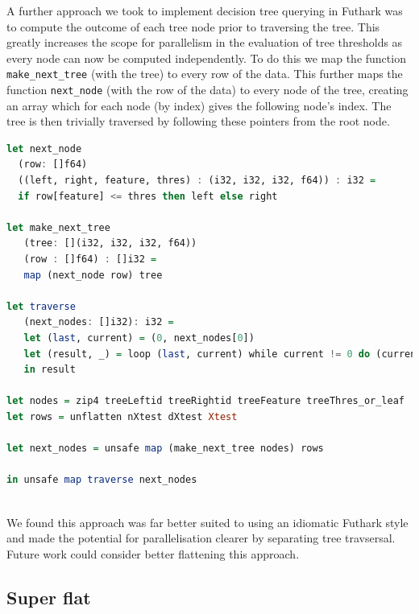 \documentclass[a4paper]{article}
\begin{document}
A further approach we took to implement decision tree querying in Futhark was to compute the outcome of each tree node prior to traversing the tree. This greatly increases the scope for parallelism in the evaluation of tree thresholds as every node can now be computed independently. To do this we map the function \texttt{make\_next\_tree} (with the tree) to every row of the data. This further maps the function \texttt{next\_node} (with the row of the data) to every node of the tree, creating an array which for each node (by index) gives the following node's index. The tree is then trivially traversed by following these pointers from the root node.

\vspace{1ex}
\begin{lrbox}{\lstboxfour}
\begin{minipage}{\textwidth}
\begin{lstlisting}[language=Haskell, breaklines]
let next_node
  (row: []f64)
  ((left, right, feature, thres) : (i32, i32, i32, f64)) : i32 =
  if row[feature] <= thres then left else right

let make_next_tree
   (tree: [](i32, i32, i32, f64))
   (row : []f64) : []i32 =
   map (next_node row) tree

let traverse
   (next_nodes: []i32): i32 =
   let (last, current) = (0, next_nodes[0])
   let (result, _) = loop (last, current) while current != 0 do (current, next_nodes[current])
   in result
   
let nodes = zip4 treeLeftid treeRightid treeFeature treeThres_or_leaf
let rows = unflatten nXtest dXtest Xtest

let next_nodes = unsafe map (make_next_tree nodes) rows

in unsafe map traverse next_nodes
   
\end{lstlisting}
\end{minipage}
\end{lrbox}
\vspace{1ex}

\colorbox{lightgray}{\usebox\lstboxfour}

We found this approach was far better suited to using an idiomatic Futhark style and made the potential for parallelisation clearer by separating tree travsersal. Future work could consider better flattening this approach.

\subsection{Super flat}
\end{document}

